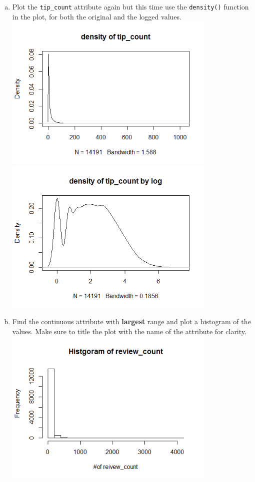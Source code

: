 \documentclass[11pt]{article}
\begin{document}
\begin{enumerate}[(a)]
\item 
Plot the \texttt{tip\_count} attribute again but this time use the \texttt{density()} function in the plot, for both the original and the logged values.\\
\includegraphics[width=4in]{density.png}\\
\includegraphics[width=4in]{density_log.png}


\item 
Find the continuous attribute with \textbf{largest} range and plot a histogram of the values. 
Make sure to title the plot with the name of the attribute for clarity.\\
\includegraphics[width=4in]{largestrange.png}



\end{enumerate}
\end{document}
